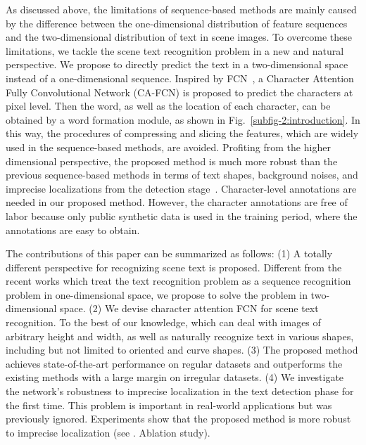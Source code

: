 \documentclass[letterpaper]{article} \usepackage{aaai19}  \usepackage{times}  \usepackage{helvet}  \usepackage{courier}  \usepackage{url}  \usepackage{graphicx}  \frenchspacing  \usepackage{multirow}
\begin{document}
As discussed above, the limitations of sequence-based methods are mainly caused by the difference between the one-dimensional distribution of feature sequences and the two-dimensional distribution of text in scene images. To overcome these limitations, we tackle the scene text recognition problem in a new and natural perspective. We propose to directly predict the text in a two-dimensional space instead of a one-dimensional sequence. Inspired by FCN~\cite{fcn}, a Character Attention Fully Convolutional Network (CA-FCN) is proposed to predict the characters at pixel level. Then the word, as well as the location of each character, can be obtained by a word formation module, as shown in Fig.~\ref{subfig-2:introduction}. In this way, the procedures of compressing and slicing the features, which are widely used in the sequence-based methods, are avoided. Profiting from the higher dimensional perspective, the proposed method is much more robust than the previous sequence-based methods in terms of text shapes, background noises, and imprecise localizations from the detection stage~\cite{LiaoSBWL17,LiaoSB18,liao2018rotation}. Character-level annotations are needed in our proposed method. However, the character annotations are free of labor because only public synthetic data is used in the training period, where the annotations are easy to obtain.


The contributions of this paper can be summarized as follows:
(1) A totally different perspective for recognizing scene text is proposed. Different from the recent works which treat the text recognition problem as a sequence recognition problem in one-dimensional space, we propose to solve the problem in two-dimensional space.
(2) We devise character attention FCN for scene text recognition. To the best of our knowledge, which can deal with images of arbitrary height and width, as well as naturally recognize text in various shapes, including but not limited to oriented and curve shapes.  
(3) The proposed method achieves state-of-the-art performance on regular datasets and outperforms the existing methods with a large margin on irregular datasets.
(4) We investigate the network's robustness to imprecise localization in the text detection phase for the first time. This problem is important in real-world applications but was previously ignored. Experiments show that the proposed method is more robust to imprecise localization (see 
. Ablation study).
\end{document}
